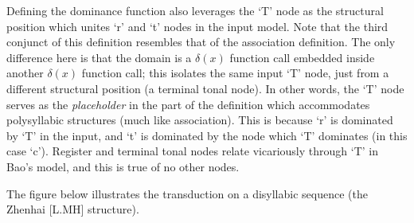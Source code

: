 \documentclass{article}
\begin{document}
Defining the dominance function also leverages the `T' node as the structural position which unites `r' and `t' nodes in the input model. Note that the third conjunct of this definition resembles that of the association definition. The only difference here is that the domain is a $\delta(x)$ function call embedded inside another $\delta(x)$ function call; this isolates the same input `T' node, just from a different structural position (a terminal tonal node). In other words, the `T' node serves as the \emph{placeholder} in the part of the definition which accommodates polysyllabic structures (much like association). This is because `r' is dominated by `T' in the input, and `t' is dominated by the node which `T' dominates (in this case `c'). Register and terminal tonal nodes relate vicariously through `T' in Bao's model, and this is true of no other nodes. \par 
The figure below illustrates the transduction on a disyllabic sequence (the Zhenhai [L.MH] structure).
\end{document}
